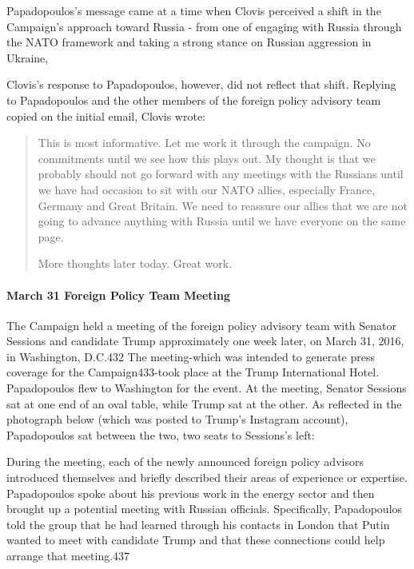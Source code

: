 Papadopoulos's message came at a time when Clovis perceived a shift in the Campaign's approach toward Russia - from one of engaging with Russia through the NATO framework and taking a strong stance on Russian aggression in Ukraine, %

Clovis's response to Papadopoulos, however, did not reflect that shift.
Replying to Papadopoulos and the other members of the foreign policy advisory team copied on the initial email, Clovis wrote:

\begin{quote}
This is most informative.
Let me work it through the campaign.
No commitments until we see how this plays out.
My thought is that we probably should not go forward with any meetings with the Russians until we have had occasion to sit with our NATO allies, especially France, Germany and Great Britain.
We need to reassure our allies that we are not going to advance anything with Russia until we have everyone on the same page.

More thoughts later today.
Great work.%
\end{quote}

\paragraph{March 31 Foreign Policy Team Meeting}

The Campaign held a meeting of the foreign policy advisory team with Senator Sessions and candidate Trump approximately one week later, on March 31, 2016, in Washington, D.C.432
The meeting-which was intended to generate press coverage for the Campaign433-took place at the Trump International Hotel.%
Papadopoulos flew to Washington for the event.
At the meeting, Senator Sessions sat at one end of an oval table, while Trump sat at the other.
As reflected in the photograph below (which was posted to Trump's Instagram account), Papadopoulos sat between the two, two seats to Sessions's left:


During the meeting, each of the newly announced foreign policy advisors introduced themselves and briefly described their areas of experience or expertise.%
Papadopoulos spoke about his previous work in the energy sector and then brought up a potential meeting with Russian officials.%
Specifically, Papadopoulos told the group that he had learned through his contacts in London that Putin wanted to meet with candidate Trump and that these connections could help arrange that meeting.437%

